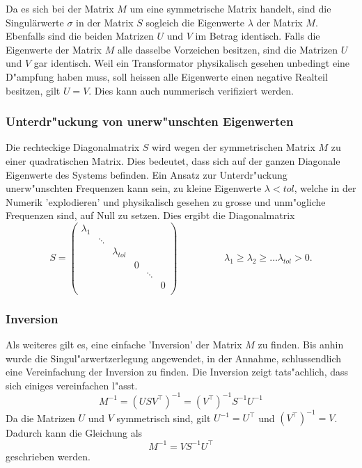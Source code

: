 \begin{refsection}
Da es sich bei der Matrix $M$ um eine symmetrische Matrix handelt, sind die Singulärwerte $\sigma$ in der Matrix $S$ sogleich die Eigenwerte $\lambda$ der Matrix $M$. Ebenfalls sind die beiden Matrizen $U$ und $V$ im Betrag identisch. Falls die Eigenwerte der Matrix $M$ alle dasselbe Vorzeichen besitzen, sind die Matrizen $U$ und $V$ gar identisch. Weil ein Transformator physikalisch gesehen unbedingt eine D"ampfung haben muss, soll heissen alle Eigenwerte einen negative Realteil besitzen, gilt $U = V$. Dies kann auch nummerisch verifiziert werden.

\subsubsection{Unterdr"uckung von unerw"unschten Eigenwerten}
Die rechteckige Diagonalmatrix $S$ wird wegen der symmetrischen Matrix $M$ zu einer quadratischen Matrix. Dies bedeutet, dass sich auf der ganzen Diagonale Eigenwerte des Systems befinden. Ein Ansatz zur Unterdr"uckung unerw"unschten Frequenzen kann sein, zu kleine Eigenwerte $\lambda < tol$, welche in der Numerik 'explodieren' und physikalisch gesehen zu grosse und unm"ogliche Frequenzen sind, auf Null zu setzen. Dies ergibt die Diagonalmatrix 
\begin{equation*}
	S = \left( 
			\begin{array}{cccccc}
				\lambda_1 & & & & & \\
				& \ddots & & & &  \\
				& & \lambda_{tol} & & & \\
				& & & 0 & & \\
				& & & & \ddots & \\
				& & & & & 0 \\				
				\end{array}
			\right) 
			\hspace{2cm}\lambda_1 \geq \lambda_2 \geq \dots \lambda_{tol} > 0. 
\end{equation*}

\subsubsection{Inversion}
Als weiteres gilt es, eine einfache 'Inversion' der Matrix $M$ zu finden. Bis anhin wurde die Singul"arwertzerlegung angewendet, in der Annahme, schlussendlich eine Vereinfachung der Inversion zu finden. Die Inversion zeigt tats"achlich, dass sich einiges vereinfachen l"asst. \cite{trafo:Watkins}
\begin{equation*}
	M^{-1} = \left(USV^\top\right)^{-1} = \left(V^\top\right)^{-1} S^{-1} U^{-1}
\end{equation*}
Da die Matrizen $U$ und $V$ symmetrisch sind, gilt $U^{-1} = U^\top$ und $\left(V^\top\right)^{-1} = V$. Dadurch kann die Gleichung als 
\begin{equation*}
	M^{-1} = V S^{-1} U^\top
\end{equation*}
geschrieben werden.


\end{refsection}
